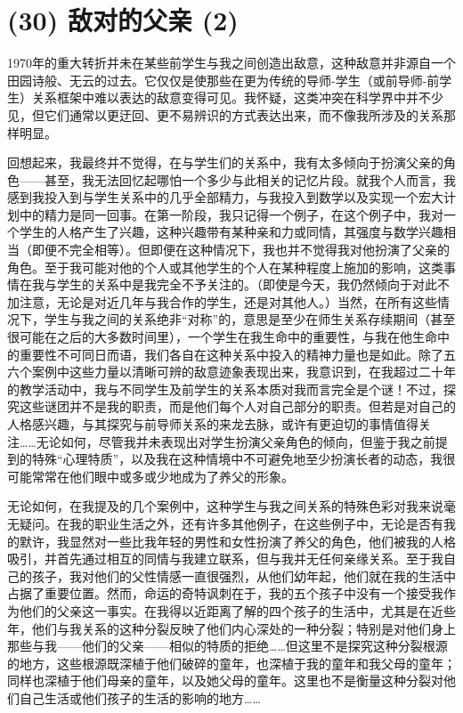 \section{(30) 敌对的父亲 (2)}

1970年的重大转折并未在某些前学生与我之间创造出敌意，这种敌意并非源自一个田园诗般、无云的过去。它仅仅是使那些在更为传统的导师-学生（或前导师-前学生）关系框架中难以表达的敌意变得可见。我怀疑，这类冲突在科学界中并不少见，但它们通常以更迂回、更不易辨识的方式表达出来，而不像我所涉及的关系那样明显。

回想起来，我最终并不觉得，在与学生们的关系中，我有太多倾向于扮演父亲的角色——甚至，我无法回忆起哪怕一个多少与此相关的记忆片段。就我个人而言，我感到我投入到与学生关系中的几乎全部精力，与我投入到数学以及实现一个宏大计划中的精力是同一回事。在第一阶段，我只记得一个例子，在这个例子中，我对一个学生的人格产生了兴趣，这种兴趣带有某种亲和力或同情，其强度与数学兴趣相当（即便不完全相等）。但即便在这种情况下，我也并不觉得我对他扮演了父亲的角色。至于我可能对他的个人或其他学生的个人在某种程度上施加的影响，这类事情在我与学生的关系中是我完全不予关注的。（即使是今天，我仍然倾向于对此不加注意，无论是对近几年与我合作的学生，还是对其他人。）当然，在所有这些情况下，学生与我之间的关系绝非“对称”的，意思是至少在师生关系存续期间（甚至很可能在之后的大多数时间里），一个学生在我生命中的重要性，与我在他生命中的重要性不可同日而语，我们各自在这种关系中投入的精神力量也是如此。除了五六个案例中这些力量以清晰可辨的敌意迹象表现出来，我意识到，在我超过二十年的教学活动中，我与不同学生及前学生的关系本质对我而言完全是个谜！不过，探究这些谜团并不是我的职责，而是他们每个人对自己部分的职责。但若是对自己的人格感兴趣，与其探究与前导师关系的来龙去脉，或许有更迫切的事情值得关注……无论如何，尽管我并未表现出对学生扮演父亲角色的倾向，但鉴于我之前提到的特殊“心理特质”，以及我在这种情境中不可避免地至少扮演长者的动态，我很可能常常在他们眼中或多或少地成为了养父的形象。

无论如何，在我提及的几个案例中，这种学生与我之间关系的特殊色彩对我来说毫无疑问。在我的职业生活之外，还有许多其他例子，在这些例子中，无论是否有我的默许，我显然对一些比我年轻的男性和女性扮演了养父的角色，他们被我的人格吸引，并首先通过相互的同情与我建立联系，但与我并无任何亲缘关系。至于我自己的孩子，我对他们的父性情感一直很强烈，从他们幼年起，他们就在我的生活中占据了重要位置。然而，命运的奇特讽刺在于，我的五个孩子中没有一个接受我作为他们的父亲这一事实。在我得以近距离了解的四个孩子的生活中，尤其是在近些年，他们与我关系的这种分裂反映了他们内心深处的一种分裂；特别是对他们身上那些与我——他们的父亲——相似的特质的拒绝……但这里不是探究这种分裂根源的地方，这些根源既深植于他们破碎的童年，也深植于我的童年和我父母的童年；同样也深植于他们母亲的童年，以及她父母的童年。这里也不是衡量这种分裂对他们自己生活或他们孩子的生活的影响的地方……